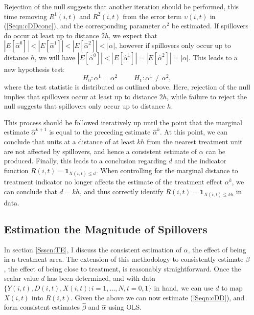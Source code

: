 Rejection of the null suggests that another iteration should be performed, this 
time removing $R^1(i,t)$ and $R^2(i,t)$ from the error term $\upsilon(i,t)$ in 
(\ref{Seqn:cDDconc}), and the corresponding parameter $\alpha^2$ be estimated.  
If spillovers do occur at least up to distance $2h$, we expect that 
$|E[\hat\alpha^0]|<|E[\hat\alpha^1]|<|E[\hat\alpha^2]|<|\alpha|$, however if 
spillovers only occur up to distance $h$, we will have 
$|E[\hat\alpha^0]|<|E[\hat\alpha^1]|=|E[\hat\alpha^2]|=|\alpha|$.  This leads 
to a new hypothesis test:
\[
H_0: \alpha^1=\alpha^2 \hspace{1cm}
H_1: \alpha^1\neq\alpha^2,
\]
where the test statistic is distributed as outlined above.  Here, rejection of 
the null implies that spillovers occur at least up to distance $2h$, while 
failure to reject the null suggests that spillovers only occur up to distance 
$h$.

This process should be followed iteratively up until the point that the marginal 
estimate $\hat\alpha^{k+1}$ is equal to the preceding estimate $\hat\alpha^{k}$.  
At this point, we can conclude that units at a distance of at least $kh$ from 
the nearest treatment unit are not affected by spillovers, and hence a 
consistent estimate of $\alpha$ can be produced. Finally, this leads to a 
conclusion regarding $d$ and the indicator function $R(i,t)=\mathbf{1}_{X(i,t)
\leq d}$.  When controlling for the marginal distance to treatment indicator no 
longer affects the estimate of the treatment effect $\alpha^k$, we can conclude 
that $d=kh$, and thus correctly identify $R(i,t)=\mathbf{1}_{X(i,t)\leq kh}$ in 
data.


\subsection{Estimation the Magnitude of Spillovers}
\label{Ssscn:SE}
In section \ref{Ssscn:TE}, I discuss the consistent estimation of $\alpha$, the
effect of being in a treatment area.  The extension of this methodology to 
consistently estimate $\beta$, the effect of being close to treatment, is 
reasonably straightforward.  Once the scalar value $d$ has been determined, and
with data $\{Y(i,t), D(i,t), X(i,t): i=1, \ldots, N, t=0, 1\}$ in hand, we can 
use $d$ to map $X(i,t)$ into $R(i,t)$. Given the above we can now estimate 
(\ref{Seqn:cDD}), and form consistent estimates $\hat\beta$ and $\hat\alpha$ 
using OLS.

